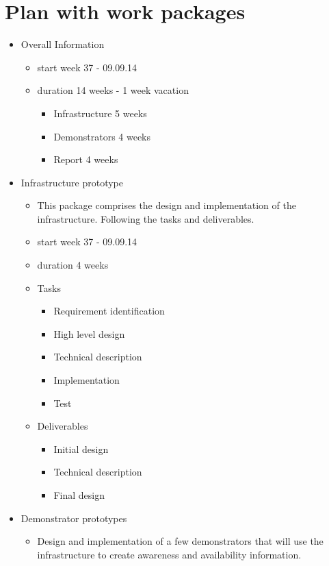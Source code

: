 \documentclass{sigchi}
\begin{document}
\section{Plan with work packages}

\begin{itemize}
\item Overall Information
    \begin{itemize}
    \item start week 37 - 09.09.14
    \item duration 14 weeks - 1 week vacation
        \begin{itemize}
        \item Infrastructure 5 weeks
        \item Demonstrators 4 weeks
        \item Report 4 weeks
        \end{itemize}
    \end{itemize}
\item Infrastructure prototype
    \begin{itemize}
    \item This package comprises the design and implementation of the infrastructure. Following the tasks and deliverables.
    \item start week 37 - 09.09.14
    \item duration 4 weeks
    \item Tasks
        \begin{itemize}
        \item Requirement identification
        \item High level design
        \item Technical description
        \item Implementation
        \item Test
        \end{itemize}
    \item Deliverables
        \begin{itemize}
        \item Initial design
        \item Technical description
        \item Final design
        \end{itemize}
    \end{itemize}
\item Demonstrator prototypes
    \begin{itemize}
    \item Design and implementation of a few demonstrators that will use the infrastructure to create awareness and availability information.

\end{itemize}
\end{itemize}
\end{document}
